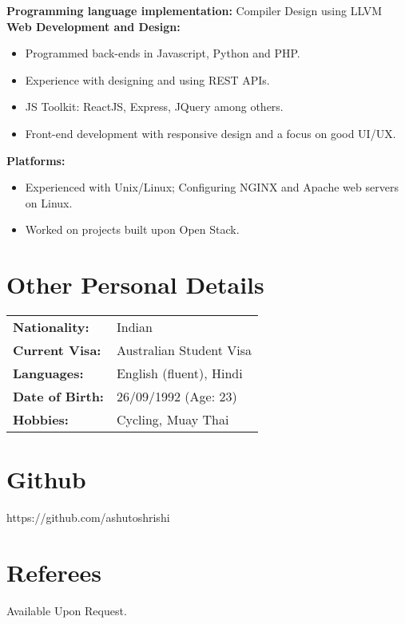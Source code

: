 \documentclass[a4paper,overlapped]{res}
\begin{document}
\begin{resume}
  \textbf{Programming language implementation:} Compiler Design using LLVM \\
  \textbf{Web Development and Design:}
  \begin{itemize}
  \item Programmed back-ends in Javascript, Python and PHP.
  \item Experience with designing and using REST APIs.
  \item JS Toolkit: ReactJS, Express, JQuery among
    others.
  \item Front-end development with responsive design and a focus on good UI/UX.
  \end{itemize}
  \textbf{Platforms:}
  \begin{itemize}
  \item Experienced with Unix/Linux; Configuring NGINX and Apache web servers on
    Linux.
  \item Worked on projects built upon Open Stack. 
  \end{itemize}

  \section{Other Personal Details}
  \begin{tabular}{l l}
    \textbf{Nationality:} & Indian \\
    \textbf{Current Visa:} & Australian Student Visa \\
    \textbf{Languages:} & English (fluent), Hindi \\
    \textbf{Date of Birth: } & 26/09/1992 (Age: 23) \\ 
    \textbf{Hobbies:} & Cycling, Muay Thai \\
  \end{tabular}

  
  \section{Github} 
  https://github.com/ashutoshrishi 
  
  \section{Referees}
  Available Upon Request.

  


  
                            
  
  
\end{resume}
\end{document}
